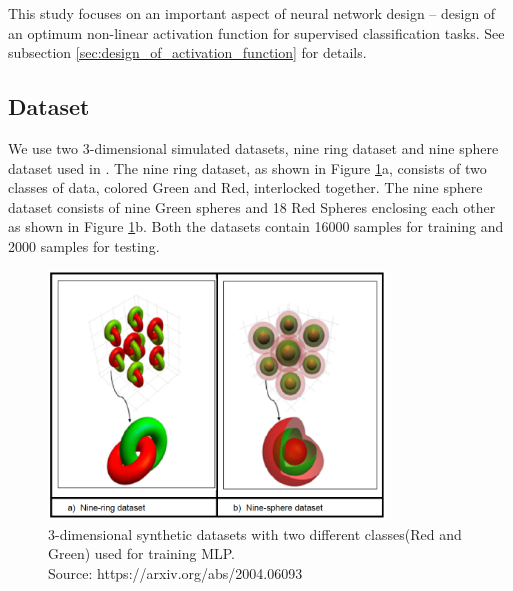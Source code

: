 \documentclass[wcp]{jmlr}
\begin{document}
This study focuses on an important aspect of neural network design -- design of an optimum non-linear activation function for supervised classification tasks. See subsection \ref{sec:design_of_activation_function} for details.

\subsection{Dataset}
We use two 3-dimensional simulated datasets, nine ring dataset and nine sphere dataset used in \cite{naitzat2020topology}. The  nine ring dataset, as shown in Figure \ref{fig:nine_ring_and_nine_sphere}a,  consists of two classes of data,  colored Green and Red, interlocked together. The nine sphere dataset consists of nine Green spheres and 18 Red Spheres enclosing each other as shown in Figure \ref{fig:nine_ring_and_nine_sphere}b. Both the datasets contain 16000 samples for training and 2000 samples for testing.

\begin{figure}[htp]
\begin{center}
\includegraphics[width=0.8\textwidth]{images/nine_ring_and_nine_sphere.png}
\caption{3-dimensional synthetic datasets with two different classes(Red and Green) used for training MLP. \\ \footnotesize{Source: https://arxiv.org/abs/2004.06093}}
    \label{fig:nine_ring_and_nine_sphere}
\end{center}
\end{figure}
\end{document}
